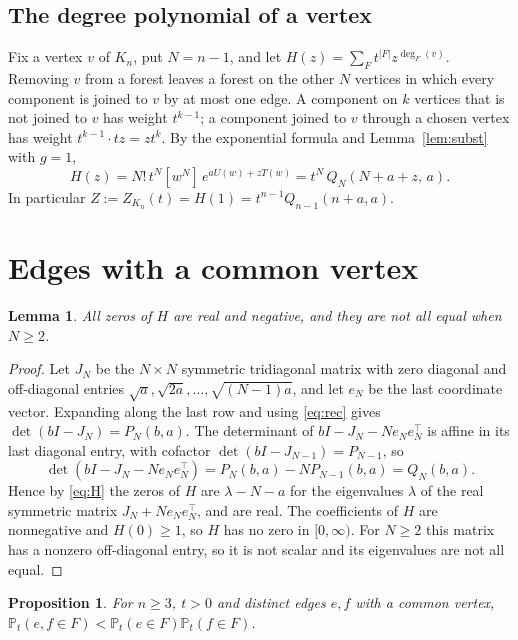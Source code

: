 \documentclass[11pt]{amsart}
\newtheorem{proposition}[theorem]{Proposition}
\newtheorem{lemma}[theorem]{Lemma}
\theoremstyle{remark}
\newcommand{\Pt}{\mathbb{P}_t}
\begin{document}
\subsection*{The degree polynomial of a vertex}
Fix a vertex $v$ of $K_n$, put $N=n-1$, and let
$H(z)=\sum_F t^{|F|}z^{\deg_F(v)}$. Removing $v$ from a forest leaves a forest on the
other $N$ vertices in which every component is joined to $v$ by at most one edge. A
component on $k$ vertices that is not joined to $v$ has weight $t^{k-1}$; a component
joined to $v$ through a chosen vertex has weight $t^{k-1}\cdot tz=zt^k$. By the
exponential formula and Lemma~\ref{lem:subst} with $g=1$,
\begin{equation}\label{eq:H}
H(z)=N!\,t^N[w^N]\,e^{aU(w)+zT(w)}=t^N\,Q_N(N+a+z,\,a).
\end{equation}
In particular $Z:=Z_{K_n}(t)=H(1)=t^{n-1}Q_{n-1}(n+a,a)$.

\section{Edges with a common vertex}\label{sec:adj}

\begin{lemma}\label{lem:real}
All zeros of $H$ are real and negative, and they are not all equal when $N\ge2$.
\end{lemma}

\begin{proof}
Let $J_N$ be the $N\times N$ symmetric tridiagonal matrix with zero diagonal and
off-diagonal entries $\sqrt a,\sqrt{2a},\dots,\sqrt{(N-1)a}$, and let $e_N$ be the last
coordinate vector. Expanding along the last row and using \eqref{eq:rec} gives
$\det(bI-J_N)=P_N(b,a)$. The determinant of $bI-J_N-Ne_Ne_N^{\top}$ is affine in its
last diagonal entry, with cofactor $\det(bI-J_{N-1})=P_{N-1}$, so
\[
\det(bI-J_N-Ne_Ne_N^{\top})=P_N(b,a)-NP_{N-1}(b,a)=Q_N(b,a).
\]
Hence by \eqref{eq:H} the zeros of $H$ are $\lambda-N-a$ for the eigenvalues $\lambda$
of the real symmetric matrix $J_N+Ne_Ne_N^{\top}$, and are real. The coefficients of $H$
are nonnegative and $H(0)\ge1$, so $H$ has no zero in $[0,\infty)$. For $N\ge2$ this
matrix has a nonzero off-diagonal entry, so it is not scalar and its eigenvalues are not
all equal.
\end{proof}

\begin{proposition}\label{prop:adj}
For $n\ge3$, $t>0$ and distinct edges $e,f$ with a common vertex,
$\Pt(e,f\in F)<\Pt(e\in F)\Pt(f\in F)$.
\end{proposition}
\end{document}
